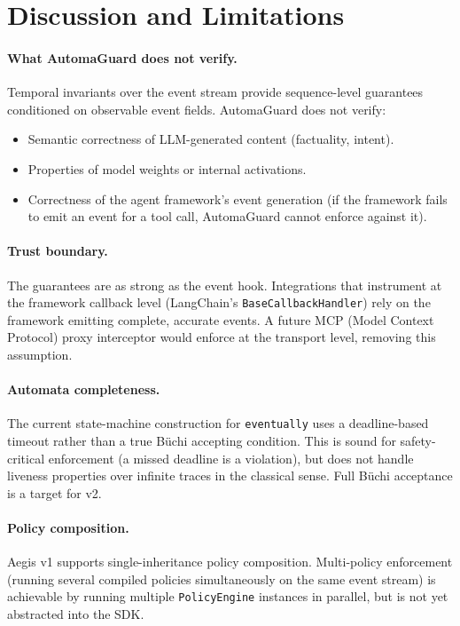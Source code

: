 \documentclass[sigconf]{acmart}
\begin{document}
\section{Discussion and Limitations}
\label{sec:discussion}

\paragraph{What AutomaGuard does not verify.}
Temporal invariants over the event stream provide sequence-level guarantees
conditioned on observable event fields. AutomaGuard does not verify:
\begin{itemize}
  \item Semantic correctness of LLM-generated content (factuality, intent).
  \item Properties of model weights or internal activations.
  \item Correctness of the agent framework's event generation
    (if the framework fails to emit an event for a tool call, AutomaGuard
    cannot enforce against it).
\end{itemize}

\paragraph{Trust boundary.}
The guarantees are as strong as the event hook. Integrations that instrument
at the framework callback level (LangChain's \texttt{BaseCallbackHandler}) rely
on the framework emitting complete, accurate events. A future MCP (Model Context
Protocol) proxy interceptor would enforce at the transport level, removing this
assumption.

\paragraph{Automata completeness.}
The current state-machine construction for \texttt{eventually} uses a
deadline-based timeout rather than a true Büchi accepting condition. This is
sound for safety-critical enforcement (a missed deadline is a violation), but
does not handle liveness properties over infinite traces in the classical sense.
Full Büchi acceptance is a target for v2.

\paragraph{Policy composition.}
Aegis v1 supports single-inheritance policy composition. Multi-policy
enforcement (running several compiled policies simultaneously on the same event
stream) is achievable by running multiple \texttt{PolicyEngine} instances in
parallel, but is not yet abstracted into the SDK.
\end{document}
